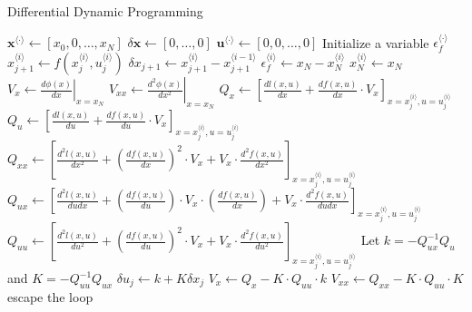\documentclass{article}
\begin{document}
\begin{algorithm}[t]
\caption{Differential Dynamic Programming}\label{DDP}
\renewcommand{\algorithmicrequire}{\textbf{Input:}}
\begin{algorithmic}[1]
\State $\mathbf{x}^{\langle \cdot \rangle}\leftarrow [x_0,0,\ldots,x_N]$
\State $\delta\mathbf{x}\leftarrow [0,\ldots,0]$
\State $\mathbf{u}^{\langle \cdot \rangle}\leftarrow [0,0,\ldots,0]$
\State Initialize a variable $\epsilon_f^{\langle \cdot \rangle}$
\textcolor{gray}{}
\textcolor{gray}{}
\State $x_{j+1}^{\langle i \rangle} \leftarrow f(x_j^{\langle i \rangle},u_j^{\langle i \rangle})$
\State $\delta x_{j+1} \leftarrow x_{j+1}^{\langle i \rangle} - x_{j+1}^{\langle i-1 \rangle}$
\EndIf
\EndFor
\State $\epsilon_f^{\langle i \rangle} \leftarrow x_N - x_N^{\langle i \rangle}$
\State $x_N^{\langle i \rangle} \leftarrow x_N$
\State $V_x \leftarrow \left.\frac{d\phi(x)}{dx}\right|_{x=x_N}$
\State $V_{xx} \leftarrow \left.\frac{d^2\phi(x)}{dx^2}\right|_{x=x_N}$
 \textcolor{gray}{}
\State $Q_x \leftarrow \left[\frac{dl(x,u)}{dx}+\frac{df(x,u)}{dx}\cdot V_x\right]_{x=x_j^{\langle i \rangle},u=u_j^{\langle i \rangle}}$
\State $Q_u \leftarrow \left[\frac{dl(x,u)}{du}+\frac{df(x,u)}{du}\cdot V_x\right]_{x=x_j^{\langle i \rangle},u=u_j^{\langle i \rangle}}$
\State $Q_{xx} \leftarrow \left[\frac{d^2l(x,u)}{dx^2}+\left(\frac{df(x,u)}{dx}\right)^2\cdot V_x + V_x \cdot \frac{d^2f(x,u)}{dx^2}\right]_{x=x_j^{\langle i \rangle},u=u_j^{\langle i \rangle}}$
\State $Q_{ux} \leftarrow \left[\frac{d^2l(x,u)}{dudx}+\left(\frac{df(x,u)}{du}\right)\cdot V_x \cdot \left(\frac{df(x,u)}{dx}\right) + V_x \cdot \frac{d^2f(x,u)}{dudx}\right]_{x=x_j^{\langle i \rangle},u=u_j^{\langle i \rangle}}$
\State $Q_{uu} \leftarrow \left[\frac{d^2l(x,u)}{du^2}+\left(\frac{df(x,u)}{du}\right)^2\cdot V_x + V_x \cdot \frac{d^2f(x,u)}{du^2}\right]_{x=x_j^{\langle i \rangle},u=u_j^{\langle i \rangle}}$
\State Let $k=-Q_{ux}^{-1}Q_{u}$ and $K=-Q_{uu}^{-1}Q_{ux}$
\State $\delta u_j \leftarrow k+K\delta x_j$\textcolor{gray}{}
\State $V_x \leftarrow Q_x-K\cdot Q_{uu}\cdot k$\textcolor{gray}{}
\State $V_{xx} \leftarrow Q_{xx}-K\cdot Q_{uu}\cdot K$
\EndFor
{}
escape the loop
\EndIf
\EndFor
\end{algorithmic}
\end{algorithm}
\end{document}

